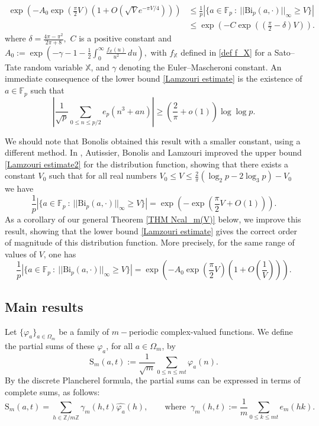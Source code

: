 \documentclass[12pt]{amsart}
\theoremstyle{definition}
\numberwithin{equation}{section}
\numberwithin{equation}{section}
\def\F{\mathbb{F}}
\def\Z{\mathbb{Z}}
\def\Bi{\mathrm{Bi}}
\def\B{\mathrm{S}}
\def\X{\mathbb{X}}
\begin{document}
\begin{align}\label{Lamzouri estimate}
\exp\left(-A_0\exp\left(\frac{\pi}{2}V\right)\left( 1+O\left(\sqrt{V}e^{-\pi V/4}\right)\right)\right)&\leq 
\frac{1}{p}\left| \Big\{
a\in \F_p 
\:: \
||\Bi_p(a,\cdot) ||_\infty \geq V
\Big\}\right| \\
\label{Lamzouri estimate2}
&\leq \exp\left(-C\exp\left(\left(\frac{\pi}{2}-\delta\right)V\right)\right).
\end{align}
where
$
\delta = \frac{4\pi-\pi^2}{2\pi+8},
$
\(C\) is a positive constant and
$
A_0:=\exp\left(
-\gamma-1-\frac12\int_0^\infty \frac{f_{\X}(u)}{u^2}\,du
\right),
$
with \(f_{\X}\) defined in \eqref{def f_X} for a Sato--Tate random variable \(\X\), and \(\gamma\) denoting the Euler--Mascheroni constant.
An immediate consequence of the lower bound \eqref{Lamzouri estimate} is the existence of $a\in\F_p$ such that
\[\left|\frac{1}{\sqrt{p}} \sum_{0\leq n\leq p/2} e_p(n^3+an)\right| \geq \left(\frac{2}{\pi}+o(1)\right)\log\log p.
 \]

We should note that Bonolis \cite{Bon22} obtained this result with a smaller constant, using a different method. In \cite{ABL21}, Autissier, Bonolis and Lamzouri improved the upper bound \eqref{Lamzouri estimate2} for the distribution function, showing that there exists a constant $V_0$ such that for all real numbers $V_0 \leq V \leq \frac{2}{\pi}(\log_2 p- 2\log_3 p) -V_0$ we have
\[\frac{1}{p}\left| \Big\{
a\in \F_p 
\:: \
||\Bi_p(a,\cdot) ||_\infty \geq V
\Big\}\right| =
\exp\left(-\exp\left(\frac{\pi }{2} V
+O(1)\right) \right). 
\]
As a corollary of our general Theorem \ref{THM Ncal_m(V)} below, we improve this result, showing that the lower bound \eqref{Lamzouri estimate} gives the correct order of magnitude of this distribution function. More precisely, for the same range of values of $V$, one has
\[\frac{1}{p}\left| \Big\{
a\in \F_p 
\:: \
||\Bi_p(a,\cdot) ||_\infty \geq V
\Big\}\right| = \exp\left(-A_0\exp\left(\frac{\pi}{2}V\right)\left( 1+O\left(\frac{1}{V}\right)\right)\right). 
\]

\subsection{Main results}

Let $\{\varphi_a\}_{a\in\Omega_m}$ be a family of $m-$periodic 
complex-valued functions. We define the partial sums of these $\varphi_a$, for all $a\in\Omega_m$, by
\begin{equation}\label{def S_m(a,t)}
\B_m(a,t):= \frac{1}{\sqrt{m}}\sum_{0\leq n \leq mt} \varphi_a(n).
\end{equation}
By the discrete Plancherel formula, the partial sums can be expressed in terms of complete sums, as follows:
\begin{equation}\label{S_m(a,t) fourier transform}
    \B_m(a,t)= \sum_{h\in\Z/m\Z}
    \gamma_m(h,t)\widehat{\varphi_a}(h), \qquad \text{where}\;\;\gamma_m(h,t) 
:= \frac{1}{m}\sum_{0\leq k \leq mt}  e_m(hk).
\end{equation}
\end{document}
